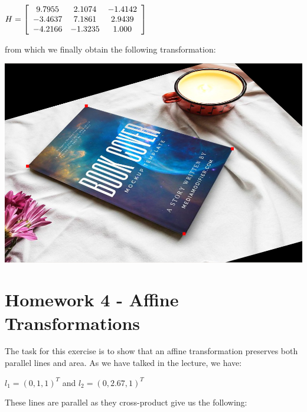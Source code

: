 \documentclass[]{article}
\begin{document}
\vspace{0.5em}

\centerline {
	$H = \left[ {\begin{array}{*{20}c}
		9.7955 & 2.1074 & -1.4142 \\
		-3.4637 & 7.1861 & 2.9439 \\
		-4.2166 & -1.3235 & 1.000
		\end{array} } \right] $
}

\vspace{0.5em}

from which we finally obtain the following transformation:

\vspace{0.5em}
\centerline {
	\includegraphics[scale=0.4]{out}
}

\vspace{0.5em}

\section{Homework 4 - Affine Transformations}

The task for this exercise is to show that an affine transformation preserves both parallel lines and area. As we have talked in the lecture, we have: 

\vspace{0.5em}

\centerline {
	$l_1 = (0, 1, 1)^T$ and $l_2=(0,2.67,1)^T$
}

\vspace{0.5em}

These lines are parallel as they cross-product give us the following:

\vspace{0.5em}
\end{document}
